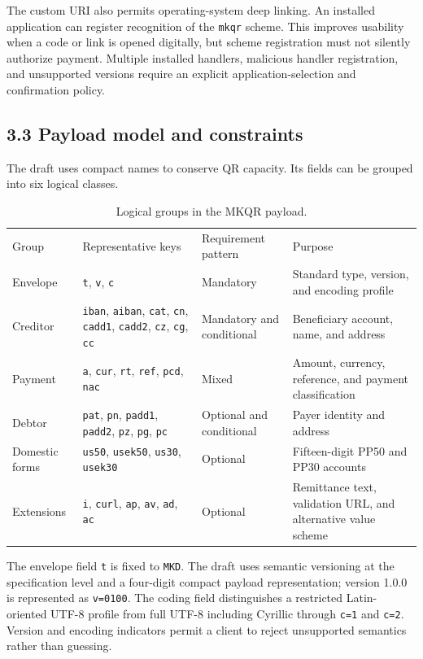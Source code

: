 The custom URI also permits operating-system deep linking. An installed application can register recognition of the \texttt{mkqr} scheme. This improves usability when a code or link is opened digitally, but scheme registration must not silently authorize payment. Multiple installed handlers, malicious handler registration, and unsupported versions require an explicit application-selection and confirmation policy.

\subsection{3.3 Payload model and constraints}

The draft uses compact names to conserve QR capacity. Its fields can be grouped into six logical classes.

\begin{table}
\caption{Logical groups in the MKQR payload.}
\begin{tabular}{llll}
Group & Representative keys & Requirement pattern & Purpose \\
Envelope & \texttt{t}, \texttt{v}, \texttt{c} & Mandatory & Standard type, version, and encoding profile \\
Creditor & \texttt{iban}, \texttt{aiban}, \texttt{cat}, \texttt{cn}, \texttt{cadd1}, \texttt{cadd2}, \texttt{cz}, \texttt{cg}, \texttt{cc} & Mandatory and conditional & Beneficiary account, name, and address \\
Payment & \texttt{a}, \texttt{cur}, \texttt{rt}, \texttt{ref}, \texttt{pcd}, \texttt{nac} & Mixed & Amount, currency, reference, and payment classification \\
Debtor & \texttt{pat}, \texttt{pn}, \texttt{padd1}, \texttt{padd2}, \texttt{pz}, \texttt{pg}, \texttt{pc} & Optional and conditional & Payer identity and address \\
Domestic forms & \texttt{us50}, \texttt{usek50}, \texttt{us30}, \texttt{usek30} & Optional & Fifteen-digit PP50 and PP30 accounts \\
Extensions & \texttt{i}, \texttt{curl}, \texttt{ap}, \texttt{av}, \texttt{ad}, \texttt{ac} & Optional & Remittance text, validation URL, and alternative value scheme \\
\end{tabular}
\end{table}

The envelope field \texttt{t} is fixed to \texttt{MKD}. The draft uses semantic versioning at the specification level and a four-digit compact payload representation; version 1.0.0 is represented as \texttt{v=0100}. The coding field distinguishes a restricted Latin-oriented UTF-8 profile from full UTF-8 including Cyrillic through \texttt{c=1} and \texttt{c=2}. Version and encoding indicators permit a client to reject unsupported semantics rather than guessing.

